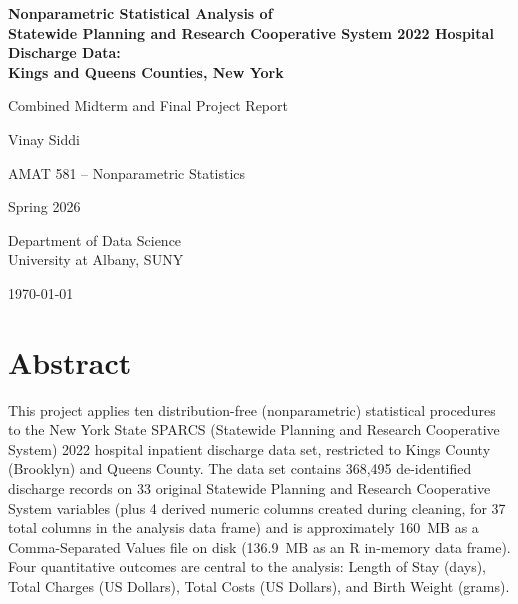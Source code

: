 \documentclass[12pt]{article}
\begin{document}
\begin{titlepage}
\centering
\vspace*{2cm}

{\LARGE \textbf{Nonparametric Statistical Analysis of\\[0.3cm] Statewide Planning and Research Cooperative System 2022 Hospital Discharge Data:\\[0.3cm] Kings and Queens Counties, New York}}

\vspace{1.0cm}

{\large Combined Midterm and Final Project Report}

\vspace{1.5cm}

{\Large Vinay Siddi}

\vspace{1cm}

{\large AMAT 581 -- Nonparametric Statistics}

\vspace{0.5cm}

{\large Spring 2026}

\vspace{1cm}

{\large Department of Data Science\\
University at Albany, SUNY}

\vspace{2cm}

{\large \today}

\vfill
\end{titlepage}

\newpage
\tableofcontents
\newpage

\section*{Abstract}

This project applies ten distribution-free (nonparametric) statistical
procedures to the New York State SPARCS (Statewide Planning and Research
Cooperative System) 2022 hospital inpatient discharge data set, restricted
to Kings County (Brooklyn) and Queens County. The data set contains
368{,}495 de-identified discharge records on 33 original Statewide Planning and Research Cooperative System variables
(plus 4 derived numeric columns created during cleaning, for 37 total
columns in the analysis data frame) and is approximately 160~MB as a Comma-Separated Values
file on disk (136.9~MB as an R in-memory data frame). Four quantitative
outcomes are central to the analysis: Length of Stay (days), Total Charges
(US Dollars), Total Costs (US Dollars), and Birth Weight (grams).
\end{document}
